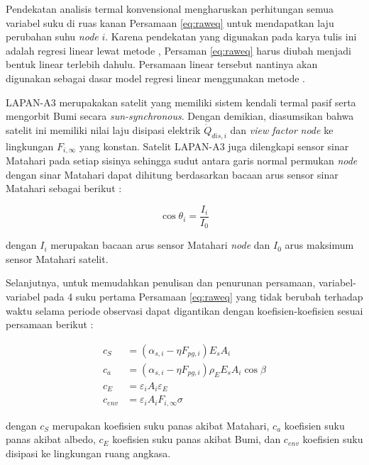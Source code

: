 Pendekatan analisis termal konvensional mengharuskan perhitungan semua variabel
suku di ruas kanan Persamaan \ref{eq:raweq} untuk mendapatkan laju perubahan
suhu \textit{node} $i$. Karena pendekatan yang digunakan pada karya tulis ini adalah
regresi linear lewat metode , Persaman \ref{eq:raweq} harus
diubah menjadi bentuk linear terlebih dahulu. Persamaan linear tersebut
nantinya akan digunakan sebagai dasar model regresi linear menggunakan metode
.

LAPAN-A3 merupakakan satelit yang memiliki sistem kendali termal pasif serta
mengorbit Bumi secara \textit{sun-synchronous}. Dengan demikian, diasumsikan
bahwa satelit ini memiliki nilai laju disipasi elektrik $\dot{Q}_{dis,i}$ dan
\textit{view factor} \textit{node} ke lingkungan $F_{i,\infty}$ yang konstan. Satelit
LAPAN-A3 juga dilengkapi sensor sinar Matahari pada setiap sisinya
\cite{hasbi2013} sehingga sudut antara garis normal permukan \textit{node} dengan sinar
Matahari dapat dihitung berdasarkan bacaan arus sensor sinar Matahari sebagai
berikut \cite{zahran2009}:

\begin{equation}
\label{eq:current}
	\cos{\theta_i} = \frac{I_i}{I_0}
\end{equation}

dengan $I_i$ merupakan bacaan arus sensor Matahari \textit{node} dan $I_0$ arus
maksimum sensor Matahari satelit.

Selanjutnya, untuk memudahkan penulisan dan penurunan persamaan,
variabel-variabel pada 4 suku pertama Persamaan \ref{eq:raweq} yang tidak
berubah terhadap waktu selama periode observasi dapat digantikan dengan
koefisien-koefisien sesuai persamaan berikut :

\begin{equation}
\label{eq:short}
\begin{split}
	c_{S} &= \left(\alpha_{s,i} - \eta F_{pg,i}\right) E_s A_i \\
	c_{a} &= \left(\alpha_{s,i} - \eta F_{pg,i}\right)\rho_{E} E_s A_i \cos{\beta} \\
	c_{E} &= \varepsilon_i A_i \varepsilon_E \\
	c_{env} &= \varepsilon_i A_i F_{i,\infty} \sigma
\end{split}
\end{equation}

dengan $c_{S}$ merupakan koefisien suku panas akibat Matahari, $c_{a}$
koefisien suku panas akibat albedo, $c_{E}$ koefisien suku panas akibat Bumi,
dan $c_{env}$ koefisien suku disipasi ke lingkungan ruang angkasa.

